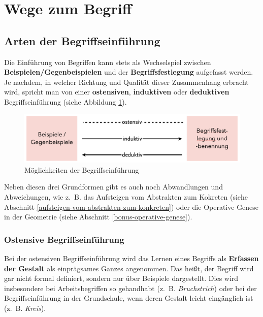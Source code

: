 \documentclass[
  ngerman,
]{scrbook}
\theoremstyle{definition}
\theoremstyle{definition}
\theoremstyle{definition}
\theoremstyle{definition}
\theoremstyle{remark}
\begin{document}
\hypertarget{wege-zum-begriff}{%
\section{Wege zum Begriff}\label{wege-zum-begriff}}

\hypertarget{arten-der-begriffseinfuxfchrung}{%
\subsection{Arten der Begriffseinführung}\label{arten-der-begriffseinfuxfchrung}}

Die Einführung von Begriffen kann stets als Wechselspiel zwischen \textbf{Beispielen/Gegenbeispielen} und der \textbf{Begriffsfestlegung} aufgefasst werden. Je nachdem, in welcher Richtung und Qualität dieser Zusammenhang erbracht wird, spricht man von einer \textbf{ostensiven}, \textbf{induktiven} oder \textbf{deduktiven} Begriffseinführung (siehe Abbildung \ref{fig:Begriffseinfuehrung}).

\begin{figure}

{\centering \includegraphics[width=0.75\linewidth]{pictures/6-Begriffe} 

}

\caption{Möglichkeiten der Begriffseinführung}\label{fig:Begriffseinfuehrung}
\end{figure}

Neben diesen drei Grundformen gibt es auch noch Abwandlungen und Abweichungen, wie z.~B. das Aufsteigen vom Abstrakten zum Kokreten (siehe Abschnitt \ref{aufsteigen-vom-abstrakten-zum-konkreten}) oder die Operative Genese in der Geometrie (siehe Abschnitt \ref{bonus-operative-genese}).

\hypertarget{ostensive-begriffseinfuxfchrung}{%
\subsubsection{Ostensive Begriffseinführung}\label{ostensive-begriffseinfuxfchrung}}

Bei der ostensiven Begriffseinführung wird das Lernen eines Begriffs als \textbf{Erfassen der Gestalt} als einprägsames Ganzes angenommen. Das heißt, der Begriff wird gar nicht formal definiert, sondern nur über Beispiele dargestellt. Dies wird insbesondere bei Arbeitsbegriffen so gehandhabt (z.~B. \emph{Bruchstrich}) oder bei der Begriffseinführung in der Grundschule, wenn deren Gestalt leicht eingänglich ist (z.~B. \emph{Kreis}).
\end{document}
